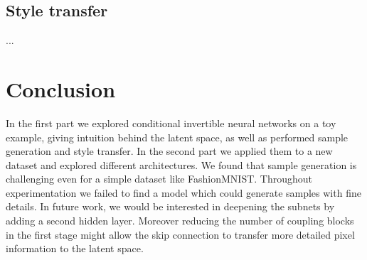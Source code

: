 \documentclass[final]{cvpr}
\begin{document}
\subsection{Style transfer}
...

\section{Conclusion}
In the first part we explored conditional invertible neural networks on a toy example, giving intuition behind the latent space, as well as performed sample generation and style transfer. In the second part we applied them to a new dataset and explored different architectures. We found that sample generation is challenging even for a simple dataset like FashionMNIST. Throughout experimentation we failed to find a model which could generate samples with fine details. In future work, we would be interested in deepening the subnets by adding a second hidden layer. Moreover reducing the number of coupling blocks in the first stage might allow the skip connection to transfer more detailed pixel information to the latent space.

{\small


}
\end{document}
